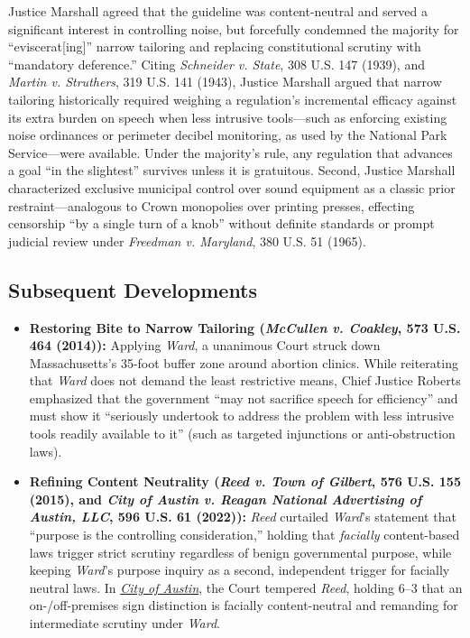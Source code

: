 \documentclass[12pt]{article}
\begin{document}
Justice Marshall agreed that the guideline was content-neutral and served a significant interest in controlling noise, but forcefully condemned the majority for ``eviscerat[ing]'' narrow tailoring and replacing constitutional scrutiny with ``mandatory deference.'' Citing \textit{Schneider v. State}, 308 U.S. 147 (1939), and \textit{Martin v. Struthers}, 319 U.S. 141 (1943), Justice Marshall argued that narrow tailoring historically required weighing a regulation's incremental efficacy against its extra burden on speech when less intrusive tools---such as enforcing existing noise ordinances or perimeter decibel monitoring, as used by the National Park Service---were available. Under the majority's rule, any regulation that advances a goal ``in the slightest'' survives unless it is gratuitous. Second, Justice Marshall characterized exclusive municipal control over sound equipment as a classic prior restraint---analogous to Crown monopolies over printing presses, effecting censorship ``by a single turn of a knob'' without definite standards or prompt judicial review under \textit{Freedman v. Maryland}, 380 U.S. 51 (1965).

\subsection{Subsequent Developments}

\begin{itemize}

\item \textbf{Restoring Bite to Narrow Tailoring (\textit{McCullen v. Coakley}, 573 U.S. 464 (2014)):} Applying \textit{Ward}, a unanimous Court struck down Massachusetts's 35-foot buffer zone around abortion clinics. While reiterating that \textit{Ward} does not demand the least restrictive means, Chief Justice Roberts emphasized that the government ``may not sacrifice speech for efficiency'' and must show it ``seriously undertook to address the problem with less intrusive tools readily available to it'' (such as targeted injunctions or anti-obstruction laws).
  \item \textbf{Refining Content Neutrality (\textit{Reed v. Town of Gilbert}, 576 U.S. 155 (2015), and \textit{City of Austin v. Reagan National Advertising of Austin, LLC}, 596 U.S. 61 (2022)):} \textit{Reed} curtailed \textit{Ward}'s statement that ``purpose is the controlling consideration,'' holding that \textit{facially} content-based laws trigger strict scrutiny regardless of benign governmental purpose, while keeping \textit{Ward}'s purpose inquiry as a second, independent trigger for facially neutral laws. In \href{https://supreme.justia.com/cases/federal/us/596/20-1029/}{\textit{City of Austin}}, the Court tempered \textit{Reed}, holding 6--3 that an on-/off-premises sign distinction is facially content-neutral and remanding for intermediate scrutiny under \textit{Ward}.

\end{itemize}
\end{document}
